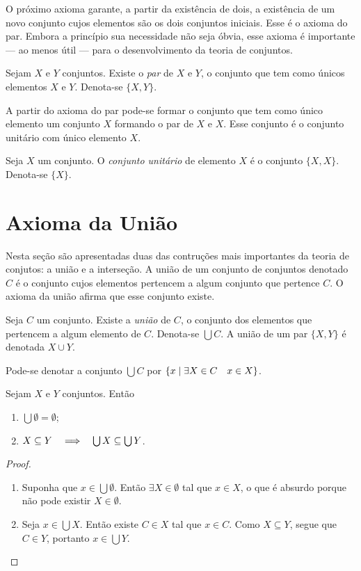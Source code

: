 O próximo axioma garante, a partir da existência de dois, a existência de um novo conjunto cujos elementos são os dois conjuntos iniciais. Esse é o axioma do par. Embora a princípio sua necessidade não seja óbvia, esse axioma é importante --- ao menos útil --- para o desenvolvimento da teoria de conjuntos.

\begin{axi}[Par]
Sejam $X$ e $Y$ conjuntos. Existe o \emph{par} de $X$ e $Y$, o conjunto que tem como únicos elementos $X$ e $Y$. Denota-se $\{X,Y\}$.
\end{axi}

A partir do axioma do par pode-se formar o conjunto que tem como único elemento um  conjunto $X$ formando o par de $X$ e $X$. Esse conjunto é o conjunto unitário com único elemento $X$.

\begin{defi}
Seja $X$ um conjunto. O \emph{conjunto unitário} de elemento $X$ é o conjunto $\{X,X\}$. Denota-se $\{X\}$.
\end{defi}

\section{Axioma da União}

Nesta seção são apresentadas duas das contruções mais importantes da teoria de conjutos: a união e a interseção. A união de um conjunto de conjuntos denotado $C$ é o conjunto cujos elementos pertencem a algum conjunto que pertence $C$. O axioma da união afirma que esse conjunto existe.

\begin{axi}[União]
Seja $C$ um conjunto. Existe a \emph{união} de $C$, o conjunto dos elementos que pertencem a algum elemento de $C$. Denota-se $\bigcup C$. A união de um par $\{X,Y\}$ é denotada $X \cup Y$.
\end{axi}

Pode-se denotar a conjunto $\bigcup C$ por $\left\{x \;\middle\vert\; \exists X \in C \quad x \in X \right\}$.

\begin{prop} Sejam $X$ e $Y$ conjuntos. Então
	\begin{enumerate}
	\item $\bigcup \emptyset = \emptyset$;
	\item $X \subseteq Y \quad \Longrightarrow \quad \bigcup X \subseteq \bigcup Y$.
	\end{enumerate}
\end{prop}
\begin{proof}
	\begin{enumerate}
	\item Suponha que $x \in \bigcup \emptyset$. Então $\exists X \in \emptyset$ tal que $x \in X$, o que é absurdo porque não pode existir $X \in \emptyset$.
	
	\item Seja $x \in \bigcup X$. Então existe $C \in X$ tal que $x \in C$. Como $X \subseteq Y$, segue que $C \in Y$, portanto $x \in \bigcup Y$.
	\end{enumerate}
\end{proof}


